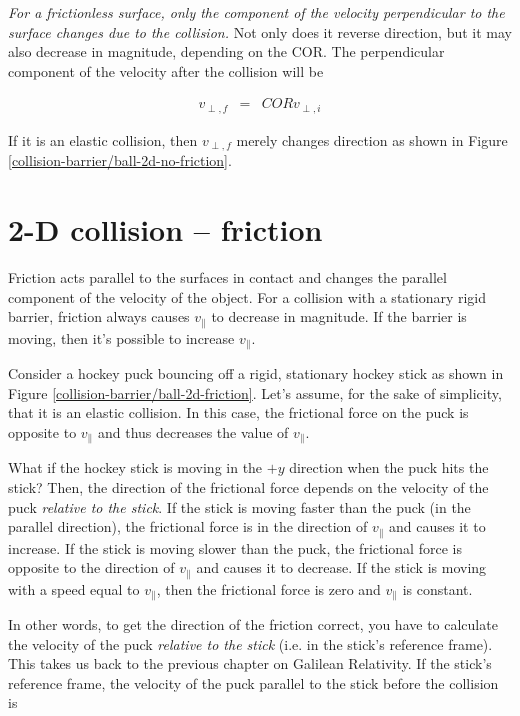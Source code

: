 \emph{For a frictionless surface, only the component of the velocity perpendicular to the surface changes due to the collision.} Not only does it reverse direction, but it may also decrease in magnitude, depending on the COR. The perpendicular component of the velocity after the collision will be

\begin{eqnarray*}
	v_{\perp,f} & = & COR v_{\perp,i}
\end{eqnarray*}

If it is an elastic collision, then $v_{\perp,f}$ merely changes direction as shown in Figure \ref{collision-barrier/ball-2d-no-friction}.

\section*{2-D collision -- friction}

Friction acts parallel to the surfaces in contact and changes the parallel component of the velocity of the object. For a collision with a stationary rigid barrier, friction always causes $v_\parallel$ to decrease in magnitude. If the barrier is moving, then it's possible to increase $v_\parallel$.

Consider a hockey puck bouncing off a rigid, stationary hockey stick as shown in Figure \ref{collision-barrier/ball-2d-friction}. Let's assume, for the sake of simplicity, that it is an elastic collision. In this case, the frictional force on the puck is opposite to $v_{\parallel}$ and thus decreases the value of $v_{\parallel}$.


What if the hockey stick is moving in the $+y$ direction when the puck hits the stick?  Then, the direction of the frictional force depends on the velocity of the puck \emph{relative to the stick}. If the stick is moving faster than the puck (in the parallel direction), the frictional force is in the direction of $v_{\parallel}$ and causes it to increase. If the stick is moving slower than the puck, the frictional force is opposite to the direction of $v_{\parallel}$ and causes it to decrease. If the stick is moving with a speed equal to $v_{\parallel}$, then the frictional force is zero and $v_{\parallel}$ is constant.

In other words, to get the direction of the friction correct, you have to calculate the velocity of the puck \emph{relative to the stick} (i.e. in the stick's reference frame). This takes us back to the previous chapter on Galilean Relativity. If the stick's reference frame, the velocity of the puck parallel to the stick before the collision is

